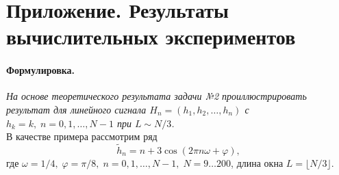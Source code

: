 \documentclass[specialist,
substylefile = spbu_report.rtx,
subf,href,colorlinks=true, 12pt]{disser}
\newcommand\norm[1]{\left\|#1\right\|}
\let\H\relax
\DeclareMathOperator\H{\mathbf{H}}
\DeclareMathOperator\B{\mathbf{B}}
\newenvironment{formulation}{\paragraph{Формулировка.}}{\hfill}
\begin{document}
	\section{Приложение. Результаты вычислительных экспериментов}
	\begin{formulation}
		\textit{На основе теоретического результата задачи №2 проиллюстрировать результат для линейного сигнала $H_n = (h_1, h_2, \dots, h_n)$ с $h_k = k,\;n=0,1,\dots,N-1$ при $L\sim N/3$.}
	\end{formulation}\\
	В качестве примера рассмотрим ряд
	\begin{equation*}
		\widetilde{h}_n = n + 3\cos(2\pi n\omega + \varphi),
	\end{equation*}
	где $\omega = 1/4,\;\varphi = \pi/8,\;n=0,1,\dots,N-1,\;N=9\dots200$, длина окна $L=\lfloor N/3\rfloor$.
\end{document}
